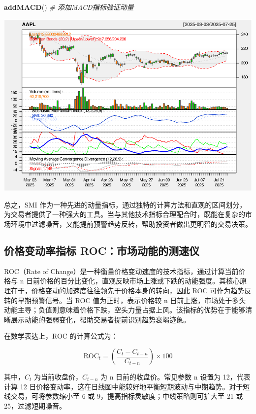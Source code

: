 \documentclass[]{ctexbook}
\newenvironment{Shaded}{\begin{snugshade}}{\end{snugshade}}
\newcommand{\CommentTok}[1]{\textcolor[rgb]{0.56,0.35,0.01}{\textit{#1}}}
\newcommand{\FunctionTok}[1]{\textcolor[rgb]{0.13,0.29,0.53}{\textbf{#1}}}
\newcommand{\NormalTok}[1]{#1}
\begin{document}
\begin{Shaded}
\begin{Highlighting}[]
\FunctionTok{addMACD}\NormalTok{()  }\CommentTok{\# 添加MACD指标验证动量}
\end{Highlighting}
\end{Shaded}

\includegraphics[width=0.9\linewidth]{QuantmodHandbook_files/figure-latex/smi_2-5}

总之，SMI 作为一种先进的动量指标，通过独特的计算方法和直观的区间划分，为交易者提供了一种强大的工具。当与其他技术指标合理配合时，既能在复杂的市场环境中过滤噪音，又能提前预警趋势反转，帮助投资者做出更明智的交易决策。

\subsection{价格变动率指标 ROC：市场动能的测速仪}\label{ux4ef7ux683cux53d8ux52a8ux7387ux6307ux6807-rocux5e02ux573aux52a8ux80fdux7684ux6d4bux901fux4eea}

ROC（Rate of Change）是一种衡量价格变动速度的技术指标，通过计算当前价格与 n 日前价格的百分比变化，直观反映市场上涨或下跌的动能强度。其核心原理在于，价格变动的加速度往往领先于价格本身的转向，因此 ROC 可作为趋势反转的早期预警信号。当 ROC 值为正时，表示价格较 n 日前上涨，市场处于多头动能主导；负值则意味着价格下跌，空头力量占据上风。该指标的优势在于能够清晰展示动能的强弱变化，帮助交易者提前识别趋势衰竭迹象。

在数学表达上，ROC 的计算公式为：

\[\text{ROC}_t = \left( \frac{C_t - C_{t-n}}{C_{t-n}} \right) \times 100\]

其中，\(C_t\) 为当前收盘价，\(C_{t-n}\) 为 n 日前的收盘价。常见参数 n 设置为 12，代表计算 12 日价格变动率，这在日线图中能较好地平衡短期波动与中期趋势。对于短线交易，可将参数缩小至 6 或 9，提高指标灵敏度；中线策略则可扩大至 21 或 25，过滤短期噪音。
\end{document}
